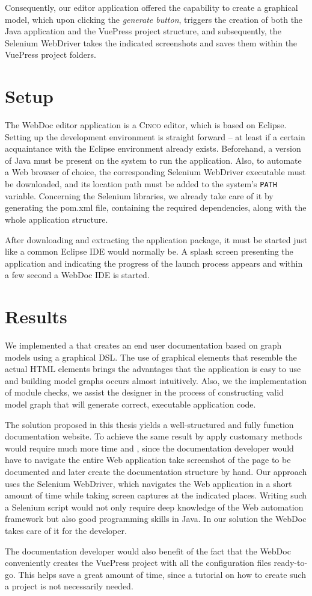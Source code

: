 Consequently, our editor application offered the capability to create a graphical model, which upon clicking the \textit{generate button}, triggers the creation of both the Java application and the VuePress project structure, and subsequently, the Selenium WebDriver takes the indicated screenshots and saves them within the VuePress project folders.

\section{Setup}\label{sec:setup}

The WebDoc editor application is a \textsc{Cinco} editor, which is based on Eclipse. Setting up the development environment is straight forward -- at least if a certain acquaintance with the Eclipse environment already exists. Beforehand, a version of Java must be present on the system to run the application. Also, to automate a Web browser of choice, the corresponding Selenium WebDriver executable must be downloaded, and its location path must be added to the system's \lstinline{PATH} variable. Concerning the Selenium libraries, we already take care of it by generating the pom.xml file, containing the required dependencies, along with the whole application structure.

After downloading and extracting the application package, it must be started just like a common Eclipse IDE would normally be. A splash screen presenting the application and indicating the progress of the launch process appears and within a few second a WebDoc IDE is started. 

\section{Results}\label{sec:res}
We implemented a  that creates an end user documentation based on graph models using a graphical DSL. The use of graphical elements that resemble the actual HTML elements brings the advantages that the application is easy to use and building model graphs occurs almost intuitively. Also, we the implementation of module checks, we assist the designer in the process of constructing valid model graph that will generate correct, executable application code.

The solution proposed in this thesis yields a well-structured and fully function documentation website. To achieve the same result by apply customary methods would require much more time and , since the documentation developer would have to navigate the entire Web application take screenshot of the page to be documented and later create the documentation structure by hand. Our approach uses the Selenium WebDriver, which navigates the Web application in a short amount of time while taking screen captures at the indicated places. Writing such a Selenium script would not only require deep knowledge of the Web automation framework but also good programming skills in Java. In our solution the WebDoc takes care of it for the developer.

The documentation developer would also benefit of the fact that the WebDoc conveniently creates the VuePress project with all the configuration files ready-to-go. This helps save a great amount of time, since a tutorial on how to create such a project is not necessarily needed.